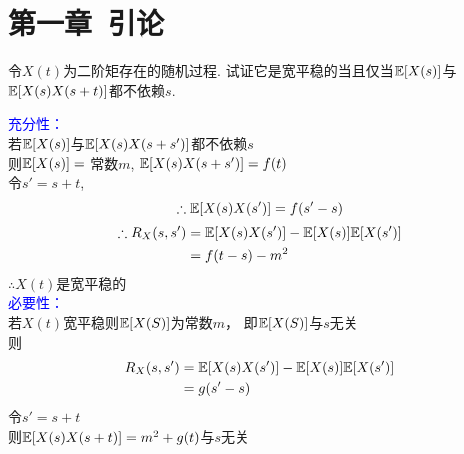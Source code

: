 \section{第一章~引论}
\begin{problem}{1.1}
令$X(t)$为二阶矩存在的随机过程. 试证它是宽平稳的当且仅当$\mathbb{E}[X(s)]$与$\mathbb{E}[X(s)X(s+t)]$都不依赖$s$.
\end{problem}
\begin{solution}
	\textcolor{blue}{充分性：}\\
	若$\mathbb{E}[X(s)]$与$\mathbb{E}[X(s)X(s+s')]$都不依赖$s$\\
	则$\mathbb{E}[X(s)] = $ 常数$m$, $\mathbb{E}[X(s)X(s+s')] = f(t)$\\
	令$s' = s + t$,\\
	\[\therefore \mathbb{E}[X(s)X(s')] = f(s'-s)\]
	\[
		\begin{aligned}
			\therefore R_X(s, s') & = \mathbb{E}[X(s)X(s')] - \mathbb{E}[X(s)]\mathbb{E}[X(s')] \\
			                      & = f(t - s) - m^2
		\end{aligned}
	\]
	$\therefore X(t)$是宽平稳的\\
	\textcolor{blue}{必要性：}\\
	若$X(t)$宽平稳则$\mathbb{E}[X(S)]$为常数$m$， 即$\mathbb{E}[X(S)]$与$s$无关\\ 则
	\[
		\begin{aligned}
			R_X(s, s') & = \mathbb{E}[X(s)X(s')] - \mathbb{E}[X(s)]\mathbb{E}[X(s')] \\
			           & = g(s' - s)                         \\
		\end{aligned}
	\]
	令$s' = s + t$ \\
	则$\mathbb{E}[X(s)X(s+t)] = m^2 + g(t)$与$s$无关\\
\end{solution}

